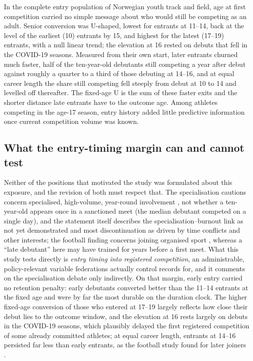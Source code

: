 \documentclass[12pt,a4paper]{article}
\begin{document}
In the complete entry population of Norwegian youth track and field, age at first competition carried no simple message about who would still be competing as an adult. Senior conversion was U-shaped, lowest for entrants at 11--14, back at the level of the earliest (10) entrants by 15, and highest for the latest (17--19) entrants, with a null linear trend; the elevation at 16 rested on debuts that fell in the COVID-19 seasons. Measured from their own start, later entrants churned much faster, half of the ten-year-old debutants still competing a year after debut against roughly a quarter to a third of those debuting at 14--16, and at equal career length the share still competing fell steeply from debut at 10 to 14 and levelled off thereafter. The fixed-age U is the sum of these faster exits and the shorter distance late entrants have to the outcome age. Among athletes competing in the age-17 season, entry history added little predictive information once current competition volume was known.

\subsection{What the entry-timing margin can and cannot test}

Neither of the positions that motivated the study was formulated about this exposure, and the revision of both must respect that. The specialisation cautions concern specialised, high-volume, year-round involvement \cite{difiori2014}, not whether a ten-year-old appears once in a sanctioned meet (the median debutant competed on a single day), and the statement itself describes the specialisation--burnout link as not yet demonstrated and most discontinuation as driven by time conflicts and other interests; the football finding concerns joining organised sport \cite{vanyperen2021}, whereas a ``late debutant'' here may have trained for years before a first meet. What this study tests directly is \emph{entry timing into registered competition}, an administrable, policy-relevant variable federations actually control records for, and it comments on the specialisation debate only indirectly. On that margin, early entry carried no retention penalty: early debutants converted better than the 11--14 entrants at the fixed age and were by far the most durable on the duration clock. The higher fixed-age conversion of those who entered at 17--19 largely reflects how close their debut lies to the outcome window, and the elevation at 16 rests largely on debuts in the COVID-19 seasons, which plausibly delayed the first registered competition of some already committed athletes; at equal career length, entrants at 14--16 persisted far less than early entrants, as the football study found for later joiners \cite{vanyperen2021}.
\end{document}
